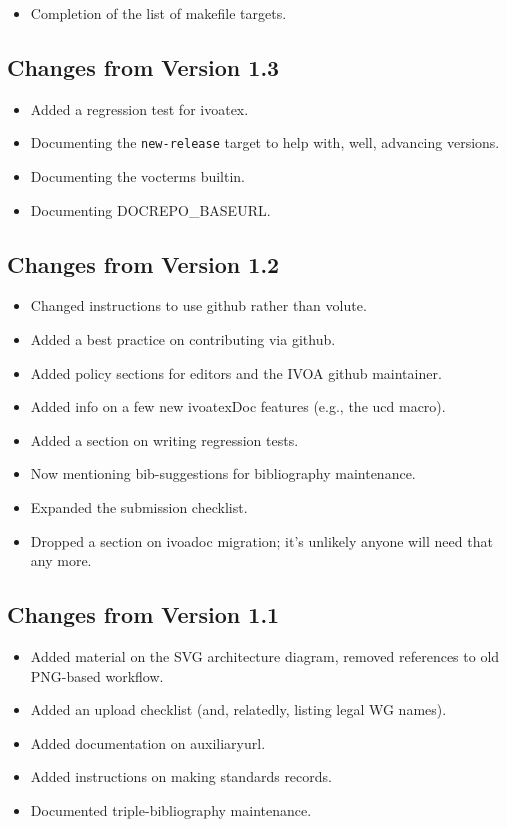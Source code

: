 \documentclass[11pt,a4paper]{ivoa}
\begin{document}
\begin{itemize}
\item Completion of the list of makefile targets.
\end{itemize}

\subsection{Changes from Version 1.3}

\begin{itemize}
\item Added a regression test for ivoatex.
\item Documenting the \verb|new-release| target to help with, well, advancing
versions.
\item Documenting the vocterms builtin.
\item Documenting DOCREPO\_BASEURL.
\end{itemize}


\subsection{Changes from Version 1.2}

\begin{itemize}
\item Changed instructions to use github rather than volute.
\item Added a best practice on contributing via github.
\item Added policy sections for editors and the IVOA github maintainer.
\item Added info on a few new ivoatexDoc features (e.g., the ucd macro).
\item Added a section on writing regression tests.
\item Now mentioning bib-suggestions for bibliography maintenance.
\item Expanded the submission checklist.
\item Dropped a section on ivoadoc migration; it's unlikely anyone
will need that any more.
\end{itemize}

\subsection{Changes from Version 1.1}

\begin{itemize}
\item Added material on the SVG architecture diagram, removed references
to old PNG-based workflow.
\item Added an upload checklist (and, relatedly, listing legal WG names).
\item Added documentation on auxiliaryurl.
\item Added instructions on making standards records.
\item Documented triple-bibliography maintenance.
\end{itemize}
\end{document}
